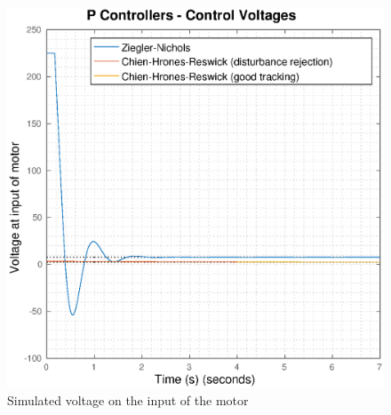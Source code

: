 \begin{figure}[t]
    \centering
    \includegraphics[width=\imagewidth]{images/Tt_PT1_P_voltages}
    \caption{Simulated voltage on the input of the motor}
    \label{fig:Tt_PT1_P_voltage}
\end{figure}

\clearpage
